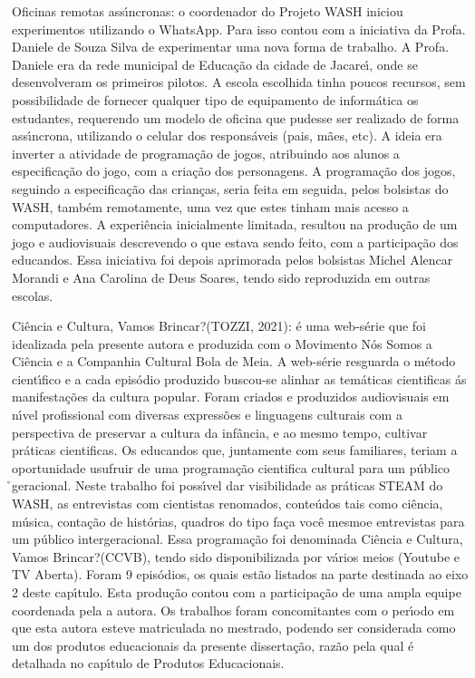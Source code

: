 \documentclass[
12pt,		%
openright,	%
twoside,  %
a4paper,			%
chapter=TITLE,		%
english,			%
french,				%
spanish,			%
brazil				%
]{USPSC-classe/USPSC}
\begin{document}
\begin{alineas}
\item Oficinas remotas ass\'{\i}ncronas: o coordenador do Projeto WASH iniciou experimentos utilizando o WhatsApp. Para isso contou com a iniciativa da Profa. Daniele de Souza Silva de experimentar uma nova forma de trabalho. A Profa. Daniele era da rede municipal de Educa\c{c}\~ao da cidade de Jacare\'{\i}, onde se desenvolveram os primeiros pilotos. A escola escolhida tinha poucos recursos, sem possibilidade de fornecer qualquer tipo de equipamento de inform\'atica os estudantes, requerendo um modelo de oficina que pudesse ser realizado de forma ass\'{\i}ncrona, utilizando o celular dos respons\'aveis (pais, m\~aes, etc). A ideia era inverter a atividade de programa\c{c}\~ao de jogos, atribuindo aos alunos a especifica\c{c}\~ao do jogo, com a cria\c{c}\~ao dos personagens. A programa\c{c}\~ao dos jogos, seguindo a especifica\c{c}\~ao das crian\c{c}as, seria feita em seguida, pelos bolsistas do WASH, tamb\'em remotamente, uma vez que estes tinham mais acesso a computadores. A experi\^encia inicialmente limitada, resultou na produ\c{c}\~ao de um jogo e audiovisuais descrevendo o que estava sendo feito, com a participa\c{c}\~ao dos educandos. Essa iniciativa foi depois aprimorada pelos bolsistas Michel Alencar Morandi e Ana Carolina de Deus Soares, tendo sido reproduzida em outras escolas.
\item \textquotedbl Ci\^encia e Cultura, Vamos Brincar?\textquotedbl   (TOZZI, 2021): \'e uma web-s\'erie que foi idealizada pela  presente autora e produzida com o Movimento N\'os Somos a Ci\^encia e a Companhia Cultural Bola de Meia. A web-s\'erie resguarda o m\'etodo cient\'{\i}fico e a cada epis\'odio produzido buscou-se alinhar as tem\'aticas cientificas \'as manifesta\c{c}\~oes  da cultura popular.  Foram criados e produzidos audiovisuais em n\'{\i}vel profissional com diversas express\~oes e linguagens culturais  com a perspectiva de preservar a cultura da inf\^ancia, e ao mesmo tempo,  cultivar pr\'aticas cientificas.  Os educandos que, juntamente com seus familiares, teriam a oportunidade usufruir de uma programa\c{c}\~ao cientifica cultural para um p\'ublico \r\ninter geracional. Neste trabalho foi poss\'{\i}vel dar visibilidade as pr\'aticas STEAM do WASH,  as entrevistas com cientistas renomados, conte\'udos tais como ci\^encia, m\'usica, conta\c{c}\~ao de hist\'orias, quadros do tipo \textquotedbl fa\c{c}a voc\^e mesmo\textquotedbl  e entrevistas para um p\'ublico intergeracional.  Essa programa\c{c}\~ao foi denominada \textquotedbl Ci\^encia e Cultura, Vamos Brincar?\textquotedbl  (CCVB), tendo sido disponibilizada por v\'arios meios (Youtube e TV Aberta). Foram 9 epis\'odios, os quais est\~ao listados na parte destinada ao eixo 2 deste cap\'{\i}tulo. Esta produ\c{c}\~ao contou com a participa\c{c}\~ao de uma ampla equipe coordenada pela a autora. Os trabalhos foram concomitantes com o per\'{\i}odo em que esta autora esteve matriculada no mestrado, podendo ser considerada como um dos produtos educacionais da presente disserta\c{c}\~ao, raz\~ao pela qual \'e detalhada no cap\'{\i}tulo de Produtos Educacionais.
\end{alineas}
\end{document}
